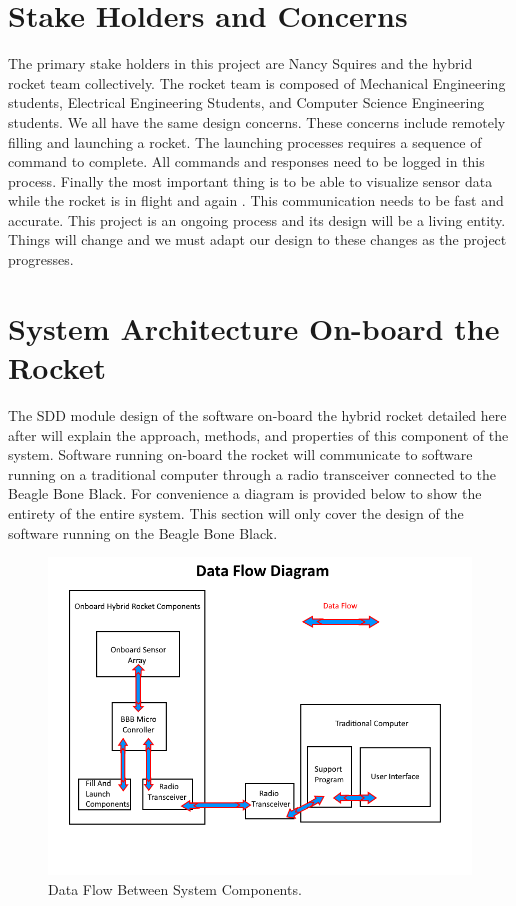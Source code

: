 \documentclass[10pt,draftclsnofoot,onecolumn,retainorgcmds]{IEEEtran}
\begin{document}
\section{Stake Holders and Concerns}
The primary stake holders in this project are Nancy Squires and the hybrid rocket team collectively. The rocket team is composed of Mechanical Engineering students, Electrical Engineering Students, and Computer Science Engineering students. We all have the same design concerns. These concerns include remotely filling and launching a rocket. The launching processes requires a sequence of command to complete. All commands and responses need to be logged in this process. Finally the most important thing is to be able to visualize sensor data while the rocket is in flight and again . This communication needs to be fast and accurate. This project is an ongoing process and its design will be a living entity. Things will change and we must adapt our design to these changes as the project progresses.
\section{System Architecture On-board the Rocket }	
The SDD module design of the software on-board the hybrid rocket detailed here after will explain the approach, methods, and properties of this component of the system. Software running on-board the rocket will communicate to software running on a traditional computer through a radio transceiver connected to the Beagle Bone Black. For convenience a diagram is provided below to show the entirety of the entire system. This section will  only cover the design of the software running on the Beagle Bone Black. \par

\begin{figure}[!ht]
	\caption{Data Flow Between System Components.}
	\centering
	\includegraphics[scale=.85]{RocketBlockDiagram}
\end{figure}
\FloatBarrier
\end{document}
